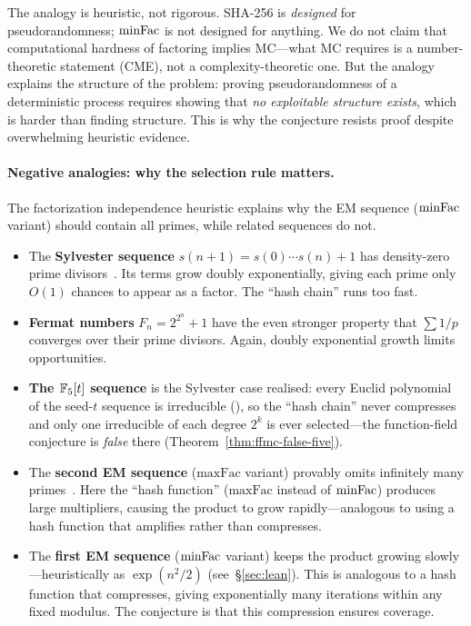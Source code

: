 The analogy is heuristic, not rigorous.  SHA-256 is \emph{designed}
for pseudorandomness; $\mathrm{minFac}$ is not designed for anything.  We do
not claim that computational hardness of factoring implies MC---what
MC requires is a number-theoretic statement (CME), not a
complexity-theoretic one.  But the analogy explains the structure of
the problem: proving pseudorandomness of a deterministic process
requires showing that \emph{no exploitable structure exists}, which is
harder than finding structure.  This is why the conjecture resists
proof despite overwhelming heuristic evidence.

\paragraph{Negative analogies: why the selection rule matters.}
The factorization independence heuristic explains why the EM sequence
($\mathrm{minFac}$ variant) should contain all primes, while related sequences
do not.

\begin{itemize}[nosep]
\item The \textbf{Sylvester sequence} $s(n{+}1) = s(0) \cdots s(n) + 1$
  has density-zero prime divisors~\cite{Odoni1985}.  Its terms grow
  doubly exponentially, giving each prime only $O(1)$ chances to appear
  as a factor.  The ``hash chain'' runs too fast.

\item \textbf{Fermat numbers} $F_n = 2^{2^n} + 1$ have the even stronger
  property that $\sum 1/p$ converges over their prime divisors.  Again,
  doubly exponential growth limits opportunities.

\item \textbf{The $\mathbb{F}_5[t]$ sequence} is the Sylvester case realised:
  every Euclid polynomial of the seed-$t$ sequence is irreducible
  (),
  so the ``hash chain'' never compresses and only one irreducible of each
  degree $2^k$ is ever selected---the function-field conjecture is
  \emph{false} there (Theorem~\ref{thm:ffmc-false-five}).

\item The \textbf{second EM sequence} ($\mathrm{maxFac}$ variant)
  provably omits infinitely many primes~\cite{CoxVdP1968,
  PollackTrevino2014}.  Here the ``hash function'' ($\mathrm{maxFac}$
  instead of $\mathrm{minFac}$) produces large multipliers, causing the product
  to grow rapidly---analogous to using a hash function that amplifies
  rather than compresses.

\item The \textbf{first EM sequence} ($\mathrm{minFac}$ variant) keeps the
  product growing slowly---heuristically as $\exp(n^2/2)$
  (see~\S\ref{sec:lean}).  This is analogous to a hash function that
  compresses, giving exponentially many iterations within any fixed
  modulus.  The conjecture is that this compression ensures coverage.
\end{itemize}


